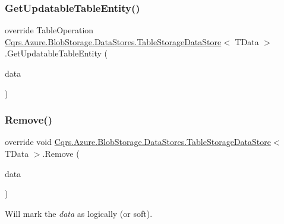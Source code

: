 \subsubsection{\texorpdfstring{Get\+Updatable\+Table\+Entity()}{GetUpdatableTableEntity()}\hspace{0.1cm}{\footnotesize\ttfamily [2/2]}}
{\footnotesize\ttfamily override Table\+Operation \hyperlink{classCqrs_1_1Azure_1_1BlobStorage_1_1DataStores_1_1TableStorageDataStore}{Cqrs.\+Azure.\+Blob\+Storage.\+Data\+Stores.\+Table\+Storage\+Data\+Store}$<$ T\+Data $>$.Get\+Updatable\+Table\+Entity (\begin{DoxyParamCaption}\item[{\hyperlink{classCqrs_1_1Azure_1_1BlobStorage_1_1EntityTableEntity}{Entity\+Table\+Entity}$<$ T\+Data $>$}]{data }\end{DoxyParamCaption})\hspace{0.3cm}{\ttfamily [protected]}}

\mbox{\label{classCqrs_1_1Azure_1_1BlobStorage_1_1DataStores_1_1TableStorageDataStore_a724d1188cdac6a7bfe7c753480f0c09a_a724d1188cdac6a7bfe7c753480f0c09a}} 
\subsubsection{\texorpdfstring{Remove()}{Remove()}}
{\footnotesize\ttfamily override void \hyperlink{classCqrs_1_1Azure_1_1BlobStorage_1_1DataStores_1_1TableStorageDataStore}{Cqrs.\+Azure.\+Blob\+Storage.\+Data\+Stores.\+Table\+Storage\+Data\+Store}$<$ T\+Data $>$.Remove (\begin{DoxyParamCaption}\item[{T\+Data}]{data }\end{DoxyParamCaption})}



Will mark the {\itshape data}  as logically (or soft). 

